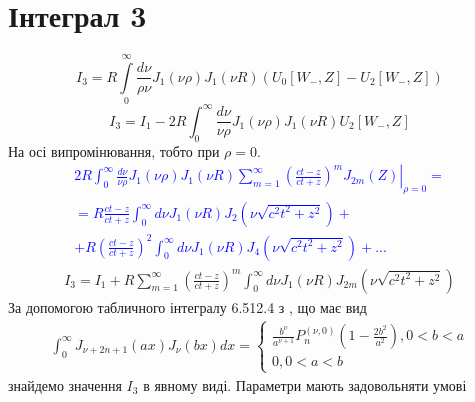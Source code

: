 \section{Інтеграл 3}

\begin{equation}
I_3 = R \int \limits_{0}^{\infty} \frac{d \nu}{\rho \nu} 
J_1(\nu \rho) J_1(\nu R) (U_0[ W_-, Z ] - U_2[ W_-, Z ])
\end{equation}
%
\begin{equation} \label{eq:intergal3}
I_3 = I_1 - 2 R \int_{0}^{\infty} \frac{d \nu}{\nu \rho} 
J_1(\nu \rho) J_1(\nu R) U_2[ W_-, Z ]
\end{equation}
%
На осі випромінювання, тобто при $ \rho = 0 $. 
%
\textcolor{blue}{ \begin{equation*} \begin{aligned}
\left. 2 R \int_{0}^{\infty} \frac{d \nu}{\nu \rho} 
J_1(\nu \rho) J_1(\nu R) \sum_{m=1}^{\infty} \left( 
\frac{ct - z}{ct + z} \right)^m J_{2m} (Z) 
\right|_{\rho = 0} = \\ = R \frac{ct - z}{ct + z} \int_{0}^{\infty} 
d \nu J_1(\nu R) J_2 (\nu \sqrt{c^2t^2 + z^2}) + \\ 
+ R \left( \frac{ct - z}{ct + z} \right)^2 
\int_{0}^{\infty} d \nu J_1(\nu R) J_4 (\nu \sqrt{c^2t^2 + z^2}) + ...
\end{aligned} \end{equation*} }
%
\begin{equation} \begin{aligned} \label{eq:i3_pol_int}
I_3 = I_1 + R \sum_{m=1}^{\infty} \left( \frac{ct - z}{ct + z} \right)^m 
\int_{0}^{\infty} d \nu J_1(\nu R) J_{2m} (\nu \sqrt{c^2t^2 + z^2})
\end{aligned} \end{equation}
%
За допомогою табличного інтегралу 6.512.4 з 
\cite[ст. 681]{imp:GradshtejnInt}, що має вид
%
\begin{equation*} \begin{aligned}
\int_0^\infty J_{\nu+2n+1} (ax) J_\nu (bx) dx = 
\begin{cases} \frac{b^\nu}{a^{\nu+1}}
P_n^{(\nu,0)} \left( 1 - \frac{2b^2}{a^2} \right) , 0 < b < a \\
0, 0 < a < b \end{cases}
\end{aligned} \end{equation*}
%
знайдемо значення $ I_3 $ в явному виді. Параметри мають задовольняти умові  
